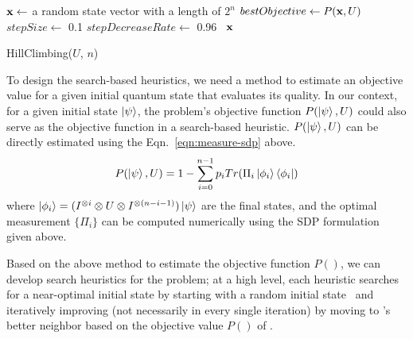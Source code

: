 \begin{algorithm}[t] 
	$\mathbf{x} \leftarrow$ a random state vector with a length of $2^{n}$\;
	$bestObjective \leftarrow P(\mathbf{x}, U)$ \;
        $stepSize \leftarrow$ 0.1 \;
        $stepDecreaseRate \leftarrow$ 0.96\ \;
	\Return $\mathbf{x}$ \;
	\caption{HillClimbing($U$, $n$)}
\label{algo:hill-climbing}
\end{algorithm}


To design the search-based heuristics, we need a method to estimate an objective value for a given initial quantum state that evaluates its quality.
In our context, for a given initial state $\ket{\psi}$, 
the \iso problem's objective function $P(\ket{\psi}, U)$ could
also serve as the objective function in a search-based heuristic.
$P(\ket{\psi}, U)$ can be directly estimated
using the Eqn.~\ref{eqn:measure-sdp} above.
\begin{equation}
P(\ket{\psi}, U) = 1-\sum_{i=0}^{n-1} p_{i} Tr(\Pi_{i}  \ket{\phi_i}\bra{\phi_i})
\label{eqn:objective}
\end{equation}
\noindent
where $\ket{\phi_i} = (I^{\otimes i} \otimes U \otimes I^{\otimes (n-i-1)})\ket{\psi}$ are the final states, and the optimal measurement $\{\Pi_i\}$ can be computed numerically using the SDP formulation given above. 

Based on the above method to estimate the objective function $P()$, we can develop  search heuristics for the \iso problem; 
at a high level, each heuristic searches for a near-optimal initial state by starting with a random initial state \vx\ and iteratively improving (not necessarily in every single iteration) by moving to \vx's better neighbor based on the objective value $P()$ of \vx. 

